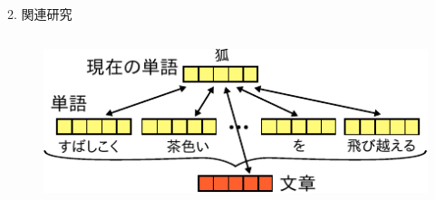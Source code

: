 \documentclass[unicode,10pt]{beamer}
\newlength{\mycolumnwidth}
\begin{document}
\begin{frame}
\begin{block}{2. 関連研究}
\begin{columns}[onlytextwidth,t]
    \begin{column}{\mycolumnwidth}
      \begin{figure}
        \includegraphics[width=0.8\linewidth]{fig/paragraph_vector.pdf}
      \end{figure}
    \end{column}
  \end{columns}
\end{block}


\end{frame}
\end{document}
